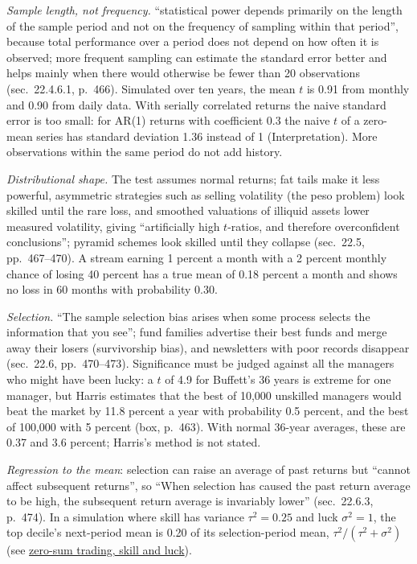\begin{qfmethod}
\emph{Sample length, not frequency.} ``statistical power depends primarily on the length of the sample period and not on the frequency of sampling within that period'', because total performance over a period does not depend on how often it is observed; more frequent sampling can estimate the standard error better and helps mainly when there would otherwise be fewer than 20 observations (sec.~22.4.6.1, p.~466). Simulated over ten years, the mean $t$ is 0.91 from monthly and 0.90 from daily data. With serially correlated returns the naive standard error is too small: for AR(1) returns with coefficient 0.3 the naive $t$ of a zero-mean series has standard deviation 1.36 instead of 1 (Interpretation). More observations within the same period do not add history.

\emph{Distributional shape.} The test assumes normal returns; fat tails make it less powerful, asymmetric strategies such as selling volatility (the peso problem) look skilled until the rare loss, and smoothed valuations of illiquid assets lower measured volatility, giving ``artificially high $t$-ratios, and therefore overconfident conclusions''; pyramid schemes look skilled until they collapse (sec.~22.5, pp.~467--470). A stream earning 1 percent a month with a 2 percent monthly chance of losing 40 percent has a true mean of 0.18 percent a month and shows no loss in 60 months with probability 0.30.

 \emph{Selection.} ``The sample selection bias arises when some process selects the information that you see''; fund families advertise their best funds and merge away their losers (survivorship bias), and newsletters with poor records disappear (sec.~22.6, pp.~470--473). Significance must be judged against all the managers who might have been lucky: a $t$ of 4.9 for Buffett's 36 years is extreme for one manager, but Harris estimates that the best of 10{,}000 unskilled managers would beat the market by 11.8 percent a year with probability 0.5 percent, and the best of 100{,}000 with 5 percent (box, p.~463). With normal 36-year averages, these are 0.37 and 3.6 percent; Harris's method is not stated.

\emph{Regression to the mean}: selection can raise an average of past returns but ``cannot affect subsequent returns'', so ``When selection has caused the past return average to be high, the subsequent return average is invariably lower'' (sec.~22.6.3, p.~474). In a simulation where skill has variance $\tau^2=0.25$ and luck $\sigma^2=1$, the top decile's next-period mean is 0.20 of its selection-period mean, $\tau^2/(\tau^2+\sigma^2)$ (see \hyperref[res:zero-sum-skill-luck]{zero-sum trading, skill and luck}).


\end{qfmethod}
